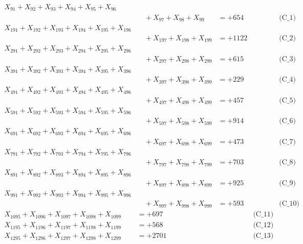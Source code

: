 \documentclass[a4paper,10pt]{article}
\begin{document}
\allowdisplaybreaks
{\small
\begin{align}
X_{91} + X_{92} + X_{93} + X_{94} + X_{95} + X_{96} \\[0.1ex]
&\quad  + X_{97} + X_{98} + X_{99} &= +654 && \text{(C\_1)} \\
X_{191} + X_{192} + X_{193} + X_{194} + X_{195} + X_{196} \\[0.1ex]
&\quad  + X_{197} + X_{198} + X_{199} &= +1122 && \text{(C\_2)} \\
X_{291} + X_{292} + X_{293} + X_{294} + X_{295} + X_{296} \\[0.1ex]
&\quad  + X_{297} + X_{298} + X_{299} &= +615 && \text{(C\_3)} \\
X_{391} + X_{392} + X_{393} + X_{394} + X_{395} + X_{396} \\[0.1ex]
&\quad  + X_{397} + X_{398} + X_{399} &= +229 && \text{(C\_4)} \\
X_{491} + X_{492} + X_{493} + X_{494} + X_{495} + X_{496} \\[0.1ex]
&\quad  + X_{497} + X_{498} + X_{499} &= +457 && \text{(C\_5)} \\
\allowbreak
X_{591} + X_{592} + X_{593} + X_{594} + X_{595} + X_{596} \\[0.1ex]
&\quad  + X_{597} + X_{598} + X_{599} &= +914 && \text{(C\_6)} \\
X_{691} + X_{692} + X_{693} + X_{694} + X_{695} + X_{696} \\[0.1ex]
&\quad  + X_{697} + X_{698} + X_{699} &= +473 && \text{(C\_7)} \\
X_{791} + X_{792} + X_{793} + X_{794} + X_{795} + X_{796} \\[0.1ex]
&\quad  + X_{797} + X_{798} + X_{799} &= +703 && \text{(C\_8)} \\
X_{891} + X_{892} + X_{893} + X_{894} + X_{895} + X_{896} \\[0.1ex]
&\quad  + X_{897} + X_{898} + X_{899} &= +925 && \text{(C\_9)} \\
X_{991} + X_{992} + X_{993} + X_{994} + X_{995} + X_{996} \\[0.1ex]
&\quad  + X_{997} + X_{998} + X_{999} &= +593 && \text{(C\_10)} \\
\allowbreak
X_{1095} + X_{1096} + X_{1097} + X_{1098} + X_{1099} &= +697 && \text{(C\_11)} \\
X_{1195} + X_{1196} + X_{1197} + X_{1198} + X_{1199} &= +568 && \text{(C\_12)} \\
X_{1295} + X_{1296} + X_{1297} + X_{1298} + X_{1299} &= +2701 && \text{(C\_13)} \\

\end{align}}
\end{document}
